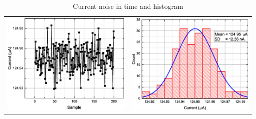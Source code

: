         \begin{table}[H]
            \begin{center}
                \begin{tabular}{cc}
                    \includegraphics[width=0.35\paperwidth]{img/07/current_time.eps}
                    &
                    \includegraphics[width=0.35\paperwidth]{img/07/current_hist.eps}
                \end{tabular}
            \end{center}
            \caption{Current noise in time and histogram}
            \label{Current_Stability}
        \end{table}

